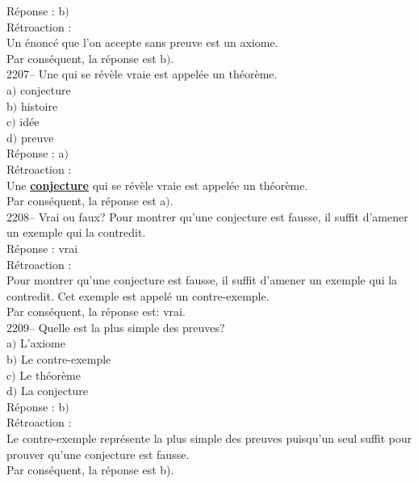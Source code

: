 \documentclass[letterpaper, 12pt]{article}
\begin{document}
R\'eponse : b$)$\\

R\'etroaction :\\
Un \'enonc\'e que l'on accepte sans preuve est un axiome.\\
Par cons\'equent, la r\'eponse est b$)$.\\

2207-- Une \underline{\qquad\qquad} qui se r\'ev\`ele vraie est appel\'ee un th\'eor\`eme.\\

a$)$ conjecture\\
b$)$ histoire\\
c$)$ id\'ee\\
d$)$ preuve\\

R\'eponse : a$)$\\

R\'etroaction :\\
Une \underline{\textbf{conjecture}} qui se r\'ev\`ele vraie est appel\'ee un th\'eor\`eme.\\
Par cons\'equent, la r\'eponse est a$)$.\\

2208-- Vrai ou faux? Pour montrer qu'une conjecture est fausse, il suffit d'amener un exemple qui la contredit. \\

R\'eponse : vrai\\

R\'etroaction :\\
Pour montrer qu'une conjecture est fausse, il suffit d'amener un exemple qui la contredit. Cet exemple est appel\'e un contre-exemple.\\
Par cons\'equent, la r\'eponse est: vrai.\\

2209-- Quelle est la plus simple des preuves?\\

a$)$ L'axiome\\
b$)$ Le contre-exemple\\
c$)$ Le th\'eor\`eme\\
d$)$ La conjecture\\

R\'eponse : b$)$\\

R\'etroaction :\\
Le contre-exemple repr\'esente la plus simple des preuves puisqu'un seul suffit pour prouver qu'une conjecture est fausse.\\
Par cons\'equent, la r\'eponse est b).\\
\end{document}
